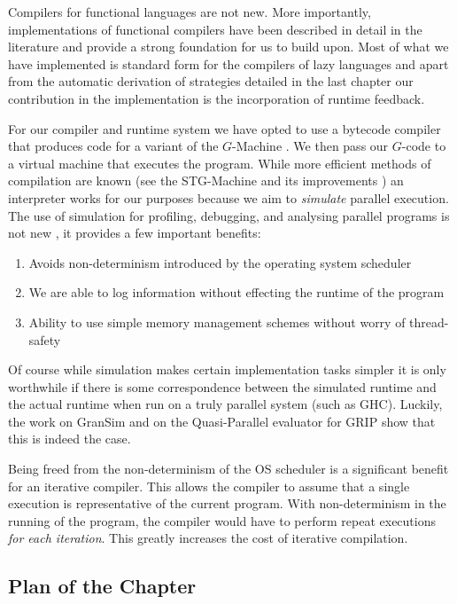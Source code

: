 Compilers for functional languages are not new. More importantly,
implementations of functional compilers have been described in detail in the
literature and provide a strong foundation for us to build upon. Most of what
we have implemented is standard form for the compilers of lazy languages and
apart from the automatic derivation of strategies detailed in the last chapter
our contribution in the implementation is the incorporation of runtime
feedback.

For our compiler and runtime system we have opted to use a bytecode compiler
that produces code for a variant of the $G$-Machine \citep{LazyMLCompiler}. We
then pass our $G$-code to a virtual machine that executes the program. While
more efficient methods of compilation are known (see the STG-Machine and its
improvements \citep{jones1992implementing, marlow2006making}) an interpreter
works for our purposes because we aim to \emph{simulate} parallel execution.
The use of simulation for profiling, debugging, and analysing parallel programs
is not new , it provides a few important
benefits:

\begin{enumerate}
    \item Avoids non-determinism introduced by the operating system scheduler
    \item We are able to log information without effecting the runtime of the
            program
    \item Ability to use simple memory management schemes without worry of
            thread-safety
\end{enumerate}

Of course while simulation makes certain implementation tasks simpler it is
only worthwhile if there is some correspondence between the simulated runtime
and the actual runtime when run on a truly parallel system (such as GHC).
Luckily, the work on GranSim and on the Quasi-Parallel evaluator for GRIP
\citep{GRIP} show that this is indeed the case.

Being freed from the non-determinism of the OS scheduler is a significant
benefit for an iterative compiler. This allows the compiler to assume that a
single execution is representative of the current program. With non-determinism
in the running of the program, the compiler would have to perform repeat
executions \emph{for each iteration}.  This greatly increases the cost of
iterative compilation.

\subsection*{Plan of the Chapter}

